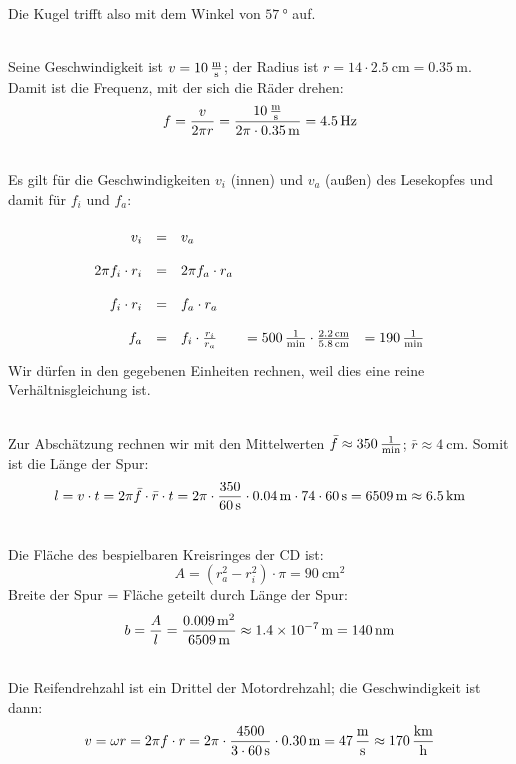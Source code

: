 \documentclass[a4paper]{article}
\begin{document}
Die Kugel trifft also mit dem Winkel von $\SI{57}{\degree}$ auf.
\vspace{0.5 cm}

\\
Seine Geschwindigkeit ist $v=\SI{10}{\meter\over \second}$; der Radius ist $r=14\cdot \SI{2,5}{\centi\meter}= \SI{0,35}{\meter}$.
Damit ist die Frequenz, mit der sich die Räder drehen:
$$ f = {v \over 2\pi r} = {\SI{10}{\meter\over \second} \over 2 \pi \cdot \SI{0,35}{\meter}}=\SI{4,5}{\hertz}$$
\vspace{0.5 cm}

\\
Es gilt für die Geschwindigkeiten $v_i$ (innen) und $v_a$ (außen) des Lesekopfes und damit für $f_i$ und $f_a$:
$$
\renewcommand{\arraystretch}{2}
\begin{array}{rclll}
v_i &=& v_a \\
2\pi f_i \cdot r_i &=& 2\pi f_a \cdot r_a\\
f_i \cdot r_i &=& f_a \cdot r_a\\
f_a &=& f_i \cdot {r_i \over r_a} &= \SI{500}{1\over\min} \cdot {\SI{2,2}{\centi\meter} \over \SI{5,8}{\centi\meter}}&=\SI{190}{1\over\min} 
\end{array}
$$
Wir dürfen in den gegebenen Einheiten rechnen, weil dies eine reine Verhältnisgleichung ist.
\vspace{0.5 cm}

\\
Zur Abschätzung rechnen wir mit den Mittelwerten $\bar{f}\approx \SI{350}{1\over\min}$; $\bar{r}\approx \SI{4}{\centi\meter}$.
Somit ist die Länge der Spur:
$$l = v\cdot t = 2\pi \bar{f} \cdot \bar{r} \cdot t = 2 \pi \cdot {350\over \SI{60}{\second}} \cdot \SI{0,04}{\meter} \cdot 74\cdot \SI{60}{\second} =  \SI{6509}{\meter} \approx \SI{6,5}{\kilo\meter}$$
\vspace{0.5 cm}

\\
Die Fläche des bespielbaren Kreisringes der CD ist:
$$A=(r_a^2-r_i^2)\cdot \pi =\SI{90}{\centi\meter^2}$$
Breite der Spur = Fläche geteilt durch Länge der Spur:
$$b={A \over l} = {\SI{0,009}{\meter^2} \over \SI{6509}{\meter}} \approx \SI{1,4e-7}{\meter}=\SI{140}{\nano\meter}$$ 
\vspace{0.5 cm}

\\
Die Reifendrehzahl ist ein Drittel der Motordrehzahl; die Geschwindigkeit ist dann:
$$v = \omega r = 2\pi f \cdot r = 2\pi \cdot {4500 \over 3 \cdot \SI{60}{\second} }\cdot \SI{0,30}{\meter} =\SI{47}{\meter\over \second}\approx \SI{170}{\kilo\meter\over \hour}$$
\vspace{0.5 cm}
\end{document}
